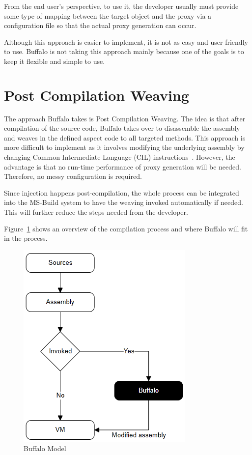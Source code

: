 From the end user's perspective, to use it, the developer usually must provide some type of mapping between the target object and the proxy via a configuration file so that the actual proxy generation can occur. 

Although this approach is easier to implement, it is not as easy and user-friendly to use. Buffalo is not taking this approach mainly because one of the goals is to keep it flexible and simple to use.

\section{Post Compilation Weaving}

The approach Buffalo takes is Post Compilation Weaving. The idea is that after compilation of the source code, Buffalo takes over to disassemble the assembly and weaves in the defined aspect code to all targeted methods. This approach is more difficult to implement as it involves modifying the underlying assembly by changing Common Intermediate Language (CIL) instructions~\cite{rewrite_msil}. However, the advantage is that no run-time performance of proxy generation will be needed. Therefore, no messy configuration is required.

Since injection happens post-compilation, the whole process can be integrated into the MS-Build system to have the weaving invoked automatically if needed. This will further reduce the steps needed from the developer.

Figure~\ref{buffalo_model} shows an overview of the compilation process and where Buffalo will fit in the process.

\begin{figure}[H]
  \includegraphics[scale=1.0]{BuffaloOverview2.PNG}
  \centering
  \caption{Buffalo Model\label{buffalo_model}}
\end{figure}


